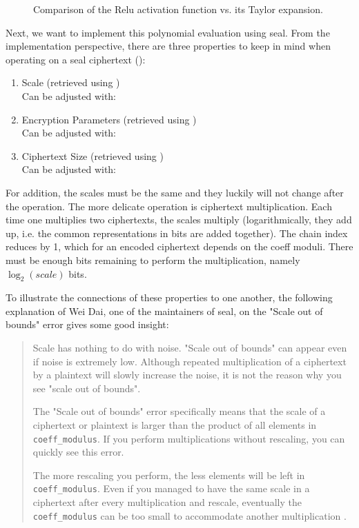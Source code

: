 \begin{figure}[H]
  \centering
  \caption[Comparison of the Relu activation function vs. its Taylor expansion]{Comparison of the Relu activation function vs. its Taylor expansion.}
  \label{fig:taylor-relu}
\end{figure}

Next, we want to implement this polynomial evaluation using \gls{seal}.
From the implementation perspective, there are three properties to keep in mind when operating on a \gls{seal} ciphertext ():

\begin{enumerate}
  \item Scale (retrieved using ) \\
        Can be adjusted with: 
  \item Encryption Parameters (retrieved using ) \\
        Can be adjusted with: 
  \item Ciphertext Size (retrieved using ) \\
        Can be adjusted with: 
\end{enumerate}

For addition, the scales must be the same and they luckily will not change after the operation.
The more delicate operation is ciphertext multiplication.
Each time one multiplies two ciphertexts, the scales multiply (logarithmically, they add up, i.e. the common representations in bits are added together).
The chain index reduces by 1, which for an encoded ciphertext depends on the coeff moduli.
There must be enough bits remaining to perform the multiplication, namely $\log_2(scale)$ bits.

To illustrate the connections of these properties to one another, the following explanation of Wei Dai, one of the maintainers of \gls{seal}, on the "Scale out of bounds" error gives some good insight:

\begin{quote}
  Scale has nothing to do with noise. "Scale out of bounds" can appear even if noise is extremely low. Although repeated multiplication of a ciphertext by a plaintext will slowly increase the noise, it is not the reason why you see "scale out of bounds".

  The "Scale out of bounds" error specifically means that the scale of a ciphertext or plaintext is larger than the product of all elements in \texttt{coeff\_modulus}. If you perform multiplications without rescaling, you can quickly see this error.

  The more rescaling you perform, the less elements will be left in \texttt{coeff\_modulus}. Even if you managed to have the same scale in a ciphertext after every multiplication and rescale, eventually the \texttt{coeff\_modulus} can be too small to accommodate another multiplication \parencite{2020-wei-github-comment}.
\end{quote}

